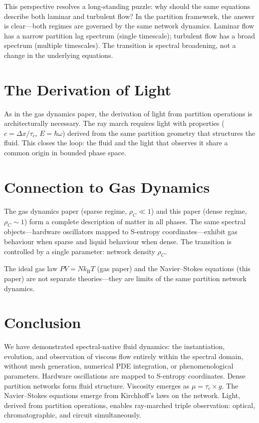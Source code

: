 \documentclass[twocolumn,10pt,a4paper]{article}
\theoremstyle{plain}
\theoremstyle{definition}
\theoremstyle{remark}
\newcommand{\kB}{k_{\mathrm{B}}}
\newcommand{\tauc}{\tau_c}
\begin{document}
This perspective resolves a long-standing puzzle: why should the same equations describe both laminar and turbulent flow? In the partition framework, the answer is clear---both regimes are governed by the same network dynamics. Laminar flow has a narrow partition lag spectrum (single timescale); turbulent flow has a broad spectrum (multiple timescales). The transition is spectral broadening, not a change in the underlying equations.

\section{The Derivation of Light}
\label{sec:light_discuss}

As in the gas dynamics paper, the derivation of light from partition operations is architecturally necessary. The ray march requires light with properties ($c = \Delta x/\tauc$, $E = \hbar\omega$) derived from the same partition geometry that structures the fluid. This closes the loop: the fluid and the light that observes it share a common origin in bounded phase space.

\section{Connection to Gas Dynamics}
\label{sec:connection}

The gas dynamics paper (sparse regime, $\rho_C \ll 1$) and this paper (dense regime, $\rho_C \sim 1$) form a complete description of matter in all phases. The same spectral objects---hardware oscillators mapped to S-entropy coordinates---exhibit gas behaviour when sparse and liquid behaviour when dense. The transition is controlled by a single parameter: network density $\rho_C$.

The ideal gas law $PV = N\kB T$ (gas paper) and the Navier--Stokes equations (this paper) are not separate theories---they are limits of the same partition network dynamics.

\section{Conclusion}
\label{sec:conclusion}

We have demonstrated spectral-native fluid dynamics: the instantiation, evolution, and observation of viscous flow entirely within the spectral domain, without mesh generation, numerical PDE integration, or phenomenological parameters. Hardware oscillations are mapped to S-entropy coordinates. Dense partition networks form fluid structure. Viscosity emerges as $\mu = \tauc \times g$. The Navier--Stokes equations emerge from Kirchhoff's laws on the network. Light, derived from partition operations, enables ray-marched triple observation: optical, chromatographic, and circuit simultaneously.
\end{document}
